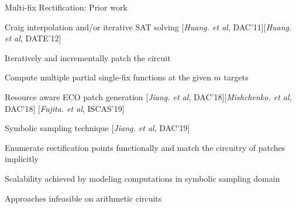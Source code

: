 \begin{frame}{\large Multi-fix Rectification: Prior work}

% 
\bi
\item Craig interpolation and/or iterative SAT solving [{\it Huang. et al}, DAC'11][{\it Huang. et al}, DATE'12]
\bi
	\item Iteratively and incrementally patch the circuit
	\item Compute multiple partial single-fix functions at the given $m$ targets
\ei
\item Resource aware ECO patch generation [{\it Jiang. et al}, DAC'18][{\it Mishchenko. et al}, DAC'18]
		[{\it Fujita. et al}, ISCAS'19]
\item Symbolic sampling technique [{\it Jiang. et al}, DAC'19]
\bi
	\item Enumerate rectification points functionally and match the circuitry of patches implicitly
	\item Scalability achieved by modeling computations in symbolic sampling domain
\ei
\pause
\vspace{0.1in}
\item Approaches infeasible on arithmetic circuits

\ei
\end{frame}

